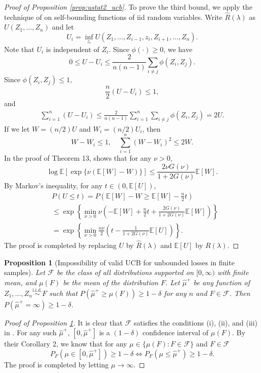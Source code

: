 \documentclass[10pt]{article}
\newtheorem{prop}{Proposition}
\def\E{\mathbb{E}}
\newcommand{\Rhat}{\widehat{R}}
\begin{document}
\begin{proof}[Proof of Proposition \ref{prop:ustat2_ucb}]
To prove the third bound, we apply the technique of \cite{maurer2006concentration} on self-bounding functions of iid random variables. Write $\Rhat(\lambda)$ as $U(Z_1, \ldots, Z_n)$ and let 
\[U_{i} = \inf_{z_i}U(Z_1, \ldots, Z_{i-1}, z_{i}, Z_{i+1}, \ldots, Z_{n}).\]
Note that $U_{i}$ is independent of $Z_{i}$. Since $\phi(\cdot)\ge 0$, we have
\[0\le U - U_{i} \le \frac{2}{n(n-1)}\sum_{i\not=j}\phi(Z_{i}, Z_{j}).\]
Since $\phi(Z_i, Z_j)\le 1$,
\[\frac{n}{2}(U - U_{i})\le 1,\]
and
\begin{align*}
  \sum_{i=1}^{n}(U - U_{i}) \le \frac{2}{n(n-1)}\sum_{i=1}^{n}\sum_{i\not=j}\phi(Z_{i}, Z_{j}) = 2U.
\end{align*}
If we let $W = (n / 2)U$ and $W_i = (n / 2)U_i$, then
\begin{equation}
  \label{eq:W_self_bound}
  W - W_{i}\le 1, \quad \sum_{i=1}^{n}(W - W_{i})^2\le 2W.
\end{equation}
In the proof of Theorem 13, \cite{maurer2006concentration} shows that for any $\nu > 0$, 
  \[\log \E[\exp\{\nu(\E[W] - W)\}]\le \frac{2\nu G(\nu)}{1 + 2 G(\nu)} \E [W].\]
  By Markov's inequality, for any $t \in (0, \E[U])$,
  \begin{align*}
  & P\left( U \le t\right)  = P\left( \E[W] - W \ge \E[W] - \frac{n}{2}t\right) \\
  & \le \exp\left\{\min_{\nu > 0}\nu\left(-\E[W] + \frac{n}{2}t + \frac{2 G(\nu)}{1 + 2 G(\nu)} \E [W]\right)\right\}\\
  & = \exp\left\{\min_{\nu > 0}\frac{n\nu}{2} \left( t - \frac{1}{1 + 2 G(\nu)} \E [U]\right)\right\}.
  \end{align*}
The proof is completed by replacing $U$ by $\Rhat(\lambda)$ and $\E[U]$ by $R(\lambda)$.
\end{proof}

\begin{prop}[Impossibility of valid UCB for unbounded losses in finite samples]\label{prop:impossibility}
Let $\mathcal{F}$ be the class of all distributions supported on $[0, \infty)$ with finite mean, and $\mu(F)$ be the mean of the distribution $F$. Let $\hat{\mu}^+$ be any function of $Z_1, \ldots, Z_n\stackrel{\mathrm{i.i.d.}}{\sim} F$ such that $P(\hat{\mu}^{+} \ge \mu(F))\ge 1 - \delta$ for any $n$ and $F\in \mathcal{F}$. Then $P(\hat{\mu}^{+} = \infty)\ge 1 - \delta$.
\end{prop}
\begin{proof}[Proof of Proposition \ref{prop:impossibility}]
It is clear that $\mathcal{F}$ satisfies the conditions (i), (ii), and (iii) in \cite{bahadur1956}. For any such $\hat{\mu}^{+}$, $[0, \hat{\mu}^{+}]$ is a $(1 - \delta)$ confidence interval of $\mu(F)$. By their Corollary 2, we know that for any $\mu\in \{\mu(F): F\in\mathcal{F}\}$ and $F\in \mathcal{F}$
\[P_{F}(\mu\in [0, \hat{\mu}^{+}])\ge 1- \delta\Longleftrightarrow P_{F}(\mu \le \hat{\mu}^{+})\ge 1 - \delta.\]
The proof is completed by letting $\mu\rightarrow \infty$.
\end{proof}
\end{document}

